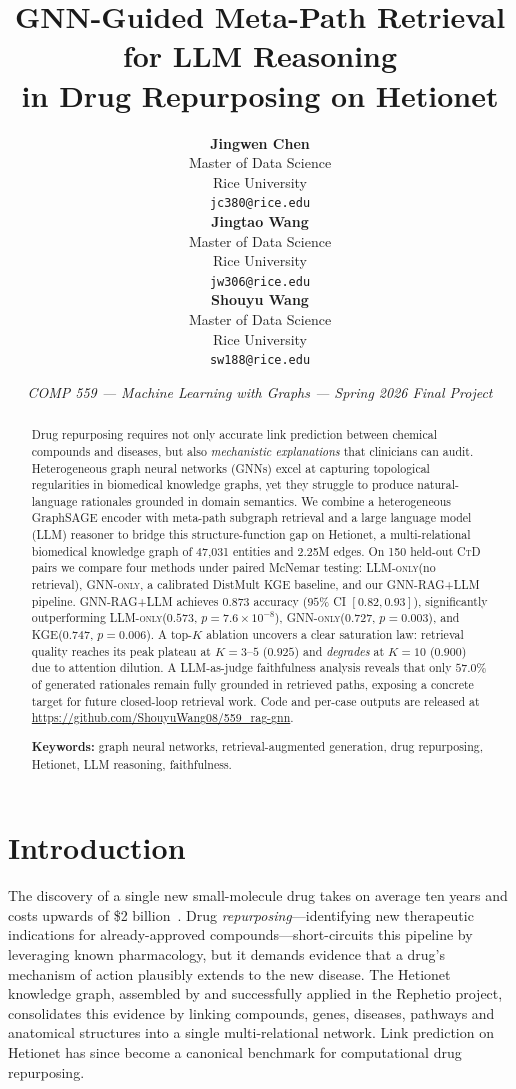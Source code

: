 \documentclass{article}
\title{GNN-Guided Meta-Path Retrieval for LLM Reasoning\\ in Drug Repurposing on Hetionet}
\author{%
  \hfil\begin{tabular}[t]{c}\textbf{Jingwen Chen}\\Master of Data Science\\Rice University\\\texttt{jc380@rice.edu}\end{tabular}\hfil%
  \begin{tabular}[t]{c}\textbf{Jingtao Wang}\\Master of Data Science\\Rice University\\\texttt{jw306@rice.edu}\end{tabular}\hfil%
  \begin{tabular}[t]{c}\textbf{Shouyu Wang}\\Master of Data Science\\Rice University\\\texttt{sw188@rice.edu}\end{tabular}\hfil%
}
\date{\textit{COMP 559 --- Machine Learning with Graphs --- Spring 2026 Final Project}}
\newcommand{\ours}{\textsc{GNN-RAG+LLM}\xspace}
\newcommand{\gnno}{\textsc{GNN-only}\xspace}
\newcommand{\llmo}{\textsc{LLM-only}\xspace}
\newcommand{\kge}{\textsc{KGE}\xspace}
\newcommand{\ctd}{\textsc{CtD}\xspace}
\begin{document}
\maketitle

\begin{abstract}
\noindent Drug repurposing requires not only accurate link prediction between chemical compounds and diseases, but also \emph{mechanistic explanations} that clinicians can audit. Heterogeneous graph neural networks (GNNs) excel at capturing topological regularities in biomedical knowledge graphs, yet they struggle to produce natural-language rationales grounded in domain semantics. We combine a heterogeneous GraphSAGE encoder with meta-path subgraph retrieval and a large language model (LLM) reasoner to bridge this structure-function gap on Hetionet, a multi-relational biomedical knowledge graph of 47{,}031 entities and 2.25M edges. On 150 held-out \ctd pairs we compare four methods under paired McNemar testing: \llmo (no retrieval), \gnno, a calibrated DistMult \kge baseline, and our \ours pipeline. \ours achieves $0.873$ accuracy ($95\%$ CI $[0.82,0.93]$), significantly outperforming \llmo ($0.573$, $p{=}7.6{\times}10^{-8}$), \gnno ($0.727$, $p{=}0.003$), and \kge ($0.747$, $p{=}0.006$). A top-$K$ ablation uncovers a clear saturation law: retrieval quality reaches its peak plateau at $K{=}3$--$5$ ($0.925$) and \emph{degrades} at $K{=}10$ ($0.900$) due to attention dilution. A LLM-as-judge faithfulness analysis reveals that only $57.0\%$ of generated rationales remain fully grounded in retrieved paths, exposing a concrete target for future closed-loop retrieval work. Code and per-case outputs are released at \url{https://github.com/ShouyuWang08/559_rag-gnn}.

\vspace{4pt}\noindent\textbf{Keywords:} graph neural networks, retrieval-augmented generation, drug repurposing, Hetionet, LLM reasoning, faithfulness.
\end{abstract}

\section{Introduction}
\label{sec:intro}

The discovery of a single new small-molecule drug takes on average ten years and costs upwards of \$2 billion~\citep{dimasi2016}. Drug \emph{repurposing}---identifying new therapeutic indications for already-approved compounds---short-circuits this pipeline by leveraging known pharmacology, but it demands evidence that a drug's mechanism of action plausibly extends to the new disease. The Hetionet knowledge graph, assembled by \citet{himmelstein2017} and successfully applied in the Rephetio project, consolidates this evidence by linking compounds, genes, diseases, pathways and anatomical structures into a single multi-relational network. Link prediction on Hetionet has since become a canonical benchmark for computational drug repurposing.
\end{document}
